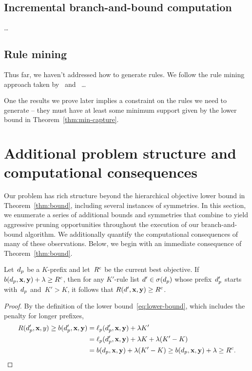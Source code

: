 \subsection{Incremental branch-and-bound computation}

\dots

\subsection{Rule mining}
\label{sec:rule-mining}

Thus far, we haven't addressed how to generate rules.
%
We follow the rule mining approach taken by~\citet{LethamRuMcMa15}
and~\citet{YangRuSe16} \dots

One the results we prove later implies a constraint on the rules
we need to generate -- they must have at least some minimum support
given by the lower bound in Theorem~\ref{thm:min-capture}.

\section{Additional problem structure and computational consequences}

Our problem has rich structure beyond the hierarchical objective lower bound
in Theorem~\ref{thm:bound}, including several instances of symmetries.
%
In this section, we enumerate a series of additional bounds and
symmetries that combine to yield aggressive pruning opportunities
throughout the execution of our branch-and-bound algorithm.
%
We additionally quantify the computational consequences of many
of these observations.
%
Below, we begin with an immediate consequence of Theorem~\ref{thm:bound}.

\begin{lemma}
Let~$d_p$ be a $K$-prefix
and let~${R^c}$ be the current best objective.
%
If ${b(d_p, \mathbf{x}, \mathbf{y}) + {\lambda} \ge {R^c}}$,
then for any $K'$-rule list ${{d}' \in \sigma(d_p)}$
whose prefix~$d_p'$ starts with~$d_p$ and~${K' > K}$,
it follows that ${R({d}', \mathbf{x}, \mathbf{y}) \ge {R^c}}$.
\end{lemma}

\begin{proof}
By the definition of the lower bound~\eqref{eq:lower-bound},
which includes the penalty for longer prefixes,
\begin{align}
\Obj(\Prefix', \x, y) \ge b(\Prefix', \x, \y) &= \Loss_p(\Prefix', \x, \y) + \Reg K' \nn \\
&= \Loss_p(\Prefix', \x, \y) + \Reg K + \Reg (K' - K) \nn \\
&= b(\Prefix, \x, \y) + \Reg (K' - K)
\ge b(\Prefix, \x, \y) + \Reg \ge \CurrentObj.
\label{eq:lookahead}
\end{align}
\end{proof}

